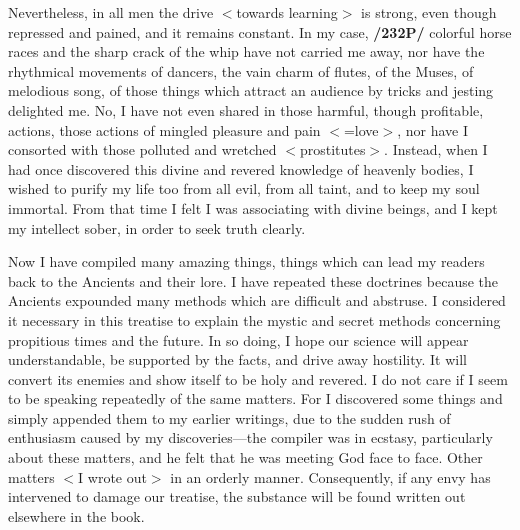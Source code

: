 Nevertheless, in all men the drive $<$towards learning$>$ is strong, even though repressed and pained, and it remains constant. In my case, \textbf{/232P/} colorful horse races and the sharp crack of the whip have not carried me away, nor have the rhythmical movements of dancers, the vain charm of flutes, of the Muses, of melodious song, of those things which attract an audience by tricks and jesting delighted me. No, I have not even shared in those harmful, though profitable, actions, those actions of mingled pleasure and pain $<$=love$>$, nor have I consorted with those polluted and wretched $<$prostitutes$>$. Instead, when I had once discovered this divine and revered knowledge of heavenly bodies, I wished to purify my life too from all evil, from all taint, and to keep my soul immortal. From that time I felt I was associating with divine beings, and I kept my intellect sober, in order to seek truth clearly.

Now I have compiled many amazing things, things which can lead my readers back to the Ancients and their lore. I have repeated these doctrines because the Ancients expounded many methods which are
difficult and abstruse. I considered it necessary in this treatise to explain the mystic and secret methods concerning propitious times and the future. In so doing, I hope our science will appear understandable, be supported by the facts, and drive away hostility. It will convert its enemies and show itself to be holy and revered. I do not care if I seem to be speaking repeatedly of the same matters. For I discovered some
things and simply appended them to my earlier writings, due to the sudden rush of enthusiasm caused by my discoveries—the compiler was in ecstasy, particularly about these matters, and he felt that he was meeting God face to face. Other matters $<$I wrote out$>$ in an orderly manner. Consequently, if any envy has intervened to damage our treatise, the substance will be found written out elsewhere in the book.

\newpage